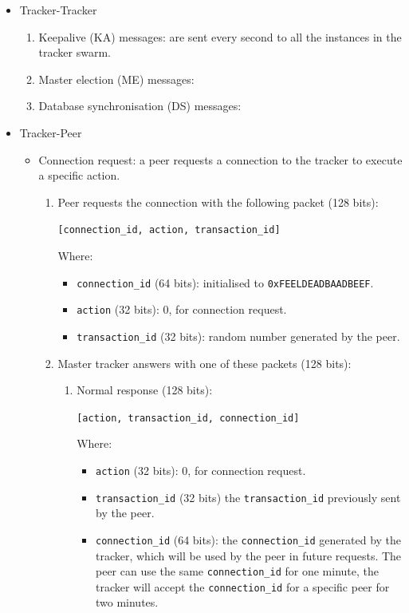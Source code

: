 \documentclass[twoside,a4paper,10pt]{article}
\begin{document}
\begin{itemize}
\item Tracker-Tracker
  \begin{enumerate}
  \item Keepalive (KA) messages: are sent every second to all the instances
    in the tracker swarm.
  \item Master election (ME) messages:
  \item Database synchronisation (DS) messages:
  \end{enumerate}
\item Tracker-Peer
  \begin{itemize}
  \item Connection request: a peer requests a
    connection to the tracker to execute a specific action.

    \begin{enumerate}
    \item Peer requests the connection with the following packet (128 bits):

      \texttt{[connection\_id, action, transaction\_id]}
      
      Where:
      \begin{itemize}
      \item \texttt{connection\_id} (64 bits): initialised to
        \texttt{0xFEELDEADBAADBEEF}.
      \item \texttt{action} (32 bits): 0, for connection request.
      \item \texttt{transaction\_id} (32 bits): random number generated by the
        peer.
      \end{itemize}
    \item Master tracker answers with one of these packets (128 bits):
      \begin{enumerate}  

      \item Normal response (128 bits):
        
        \texttt{[action, transaction\_id, connection\_id]}

        Where:  
        \begin{itemize}
        \item \texttt{action} (32 bits): 0, for connection request.
        \item \texttt{transaction\_id} (32 bits)
          the \texttt{transaction\_id} previously sent by the peer.
        \item \texttt{connection\_id} (64 bits):
          the \texttt{connection\_id} generated by the tracker, which will be
          used by the peer in future requests. The peer can use the same
          \texttt{connection\_id} for one minute, the tracker will accept the
          \texttt{connection\_id} for a specific peer for two minutes.
        \end{itemize}


\end{enumerate}
\end{enumerate}
\end{itemize}
\end{itemize}
\end{document}
